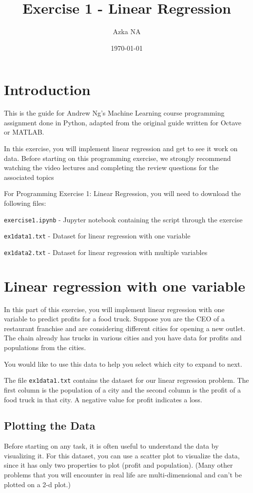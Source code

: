 \documentclass[12pt]{article}
\title{Exercise 1 - Linear Regression}
\author{Azka NA}
\date{\today}
\begin{document}
\maketitle

\section{Introduction}
This is the guide for Andrew Ng's Machine Learning course programming assignment done in Python, adapted from the original guide written for Octave or MATLAB.

In this exercise, you will implement linear regression and get to see it work on data. Before starting on this programming exercise, we strongly recommend watching the video lectures and completing the review questions for the associated topics

For Programming Exercise 1: Linear Regression, you will need to download the following files:

\texttt{exercise1.ipynb} - Jupyter notebook containing the script through the exercise

\texttt{ex1data1.txt} - Dataset for linear regression with one variable

\texttt{ex1data2.txt} - Dataset for linear regression with multiple variables

\section{Linear regression with one variable}

In this part of this exercise, you will implement linear regression with one variable to predict profits for a food truck. Suppose you are the CEO of a restaurant franchise and are considering different cities for opening a new outlet. The chain already has trucks in various cities and you have data for profits and populations from the cities.

You would like to use this data to help you select which city to expand to next.

The file \texttt{ex1data1.txt} contains the dataset for our linear regression problem. The first column is the population of a city and the second column is the profit of a food truck in that city. A negative value for profit indicates a loss.

\subsection{Plotting the Data}
Before starting on any task, it is often useful to understand the data by visualizing it. For this dataset, you can use a scatter plot to visualize the data, since it has only two properties to plot (profit and population). (Many other problems that you will encounter in real life are multi-dimensional and can’t be plotted on a 2-d plot.)
\end{document}

